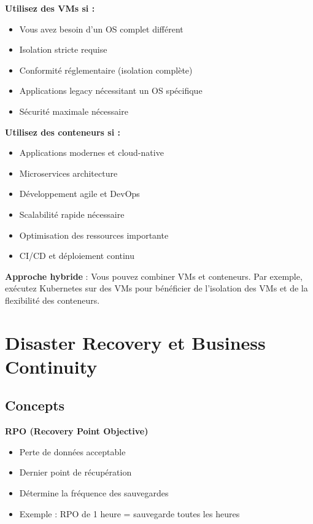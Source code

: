 \documentclass[11pt,a4paper]{article}
\begin{document}
\textbf{Utilisez des VMs si :}
\begin{itemize}
    \item Vous avez besoin d'un OS complet différent
    \item Isolation stricte requise
    \item Conformité réglementaire (isolation complète)
    \item Applications legacy nécessitant un OS spécifique
    \item Sécurité maximale nécessaire
\end{itemize}

\textbf{Utilisez des conteneurs si :}
\begin{itemize}
    \item Applications modernes et cloud-native
    \item Microservices architecture
    \item Développement agile et DevOps
    \item Scalabilité rapide nécessaire
    \item Optimisation des ressources importante
    \item CI/CD et déploiement continu
\end{itemize}

\begin{tipbox}
\textbf{Approche hybride} : Vous pouvez combiner VMs et conteneurs. Par exemple, exécutez Kubernetes sur des VMs pour bénéficier de l'isolation des VMs et de la flexibilité des conteneurs.
\end{tipbox}

\section{Disaster Recovery et Business Continuity}

\subsection{Concepts}

\textbf{RPO (Recovery Point Objective)}
\begin{itemize}
    \item Perte de données acceptable
    \item Dernier point de récupération
    \item Détermine la fréquence des sauvegardes
    \item Exemple : RPO de 1 heure = sauvegarde toutes les heures
\end{itemize}
\end{document}
